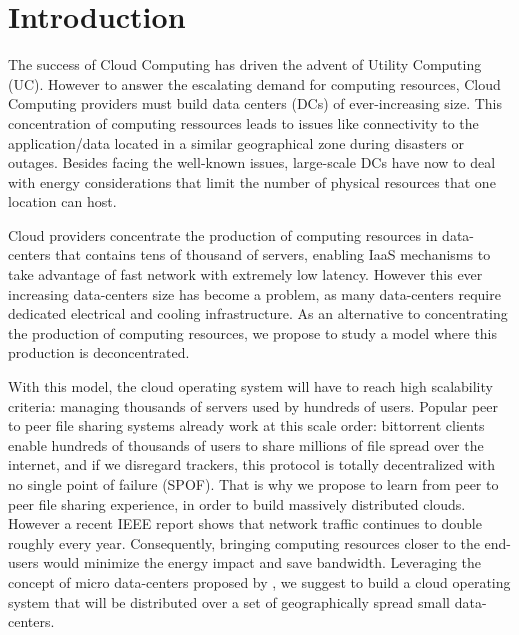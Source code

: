 \section{Introduction}
\label{sec:intro} 



The success of Cloud Computing has driven the advent of Utility Computing (UC). 
However to answer the escalating demand for computing resources, 
Cloud Computing providers must build data centers (DCs) of ever-increasing size.
This concentration of computing ressources leads to issues like connectivity to
the application/data located in a similar geographical zone during disasters or
outages. Besides facing the well-known issues, large-scale DCs have now to deal 
with energy considerations that limit the number of physical resources that one 
location can host.

Cloud providers concentrate the production of computing resources in 
data-centers that contains tens of thousand of servers, enabling IaaS mechanisms
to take advantage of fast network with extremely low latency. However this ever 
increasing data-centers size has become a problem, as many data-centers require 
dedicated electrical and cooling infrastructure. As an alternative to 
concentrating the production of computing resources, we propose to study a model
where this production is deconcentrated.




With this model, the cloud operating system will have to reach high scalability 
criteria: managing thousands of servers used by hundreds of users. Popular peer 
to peer file sharing systems already work at this scale order: bittorrent 
clients enable hundreds of thousands of users to share millions of file spread 
over the internet, and if we disregard trackers, this protocol is totally 
decentralized with no single point of failure (SPOF). That is why we propose to 
learn from peer to peer file sharing experience, in order to build massively 
distributed clouds. However a recent IEEE report \cite{ieeenetreport:2012} shows
that network traffic continues to double roughly every year. Consequently, 
bringing computing resources closer to the end-users would minimize the energy
impact and save bandwidth. Leveraging the concept of micro data-centers 
proposed by \cite{greenberg:2008}, we suggest to build a cloud operating system 
that will be distributed over a set of geographically spread small data-centers. 



